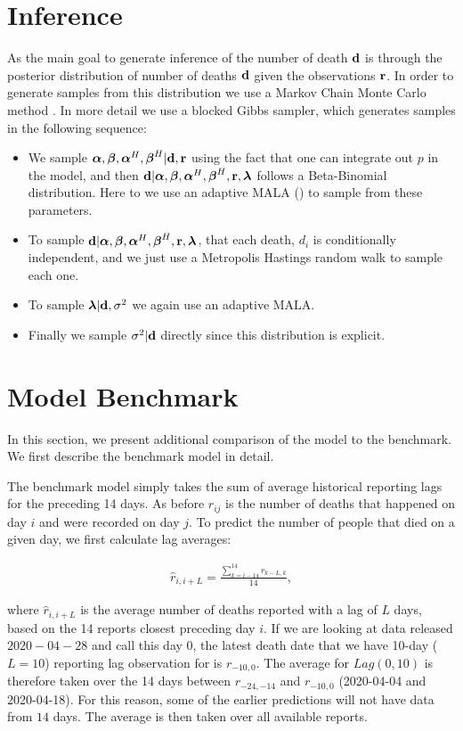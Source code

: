 \section{Inference}
As the main goal to generate inference of the number of death ${\boldsymbol{\mathrm{d}}}$ is through the posterior distribution of number of deaths ${\boldsymbol{\mathrm{d}}}$ given the observations ${\boldsymbol{\mathrm{r}}}$.
In order to generate samples from this distribution we use a Markov Chain Monte Carlo method \cite{Brooks2011_handbook_markov}. In more detail we use a blocked Gibbs sampler, which generates samples in the following sequence:
\begin{itemize}
	\item  We sample ${\boldsymbol{\mathrm{\alpha}}},{\boldsymbol{\mathrm{\beta}}}, {\boldsymbol{\mathrm{\alpha}}}^H,{\boldsymbol{\mathrm{\beta}}}^H|{\boldsymbol{\mathrm{d}}}, {\boldsymbol{\mathrm{r}}}$ using the fact that one can integrate out $p$ in the model, and then  ${\boldsymbol{\mathrm{d}}}|{\boldsymbol{\mathrm{\alpha}}},{\boldsymbol{\mathrm{\beta}}}, {\boldsymbol{\mathrm{\alpha}}}^H,{\boldsymbol{\mathrm{\beta}}}^H,{\boldsymbol{\mathrm{r}}},{\boldsymbol{\mathrm{\lambda}}}$  follows a Beta-Binomial distribution. Here to we use an adaptive MALA (\cite{Atchade2006_adaptive_version}) to sample from these parameters.
	\item  To sample ${\boldsymbol{\mathrm{d}}}|{\boldsymbol{\mathrm{\alpha}}},{\boldsymbol{\mathrm{\beta}}}, {\boldsymbol{\mathrm{\alpha}}}^H,{\boldsymbol{\mathrm{\beta}}}^H,{\boldsymbol{\mathrm{r}}},{\boldsymbol{\mathrm{\lambda}}}$, that each death, $d_i$ is conditionally independent, and we just use a Metropolis Hastings random walk to sample each one.
	\item To sample ${\boldsymbol{\mathrm{\lambda}}} | {\boldsymbol{\mathrm{d}}},\sigma^2$ we again use an adaptive MALA.
	\item Finally we sample $\sigma^2|{\boldsymbol{\mathrm{d}}}$ directly since this distribution is explicit.
\end{itemize}

\section{Model Benchmark}
In this section, we present additional comparison of the model to the benchmark. We first describe the benchmark model in detail.

The benchmark model simply takes the sum of average historical reporting lags for the preceding 14 days. As before $r_{ij}$ is the number of deaths that happened on day $i$ and were recorded on day $j$. To predict the number of people that died on a given day, we first calculate lag averages:

\begin{align}
    \hat{r}_{i, i+L} = \frac{\sum^{14}_{k=i-14} r_{k - L, k}}{14},
\end{align}

where $\hat{r}_{i, i+L}$ is the average number of deaths reported with a lag of $L$ days, based on the 14 reports closest preceding day $i$. If we are looking at data released $2020-04-28$ and call this day 0, the latest death date that we have 10-day ($L=10$) reporting lag observation for is $r_{-10,0}$. The average for $Lag(0, 10)$ is therefore taken over the 14 days between $r_{-24,-14}$ and $r_{-10,0}$ (2020-04-04 and 2020-04-18). For this reason, some of the earlier predictions will not have data from $14$ days. The average is then taken over all available reports.

